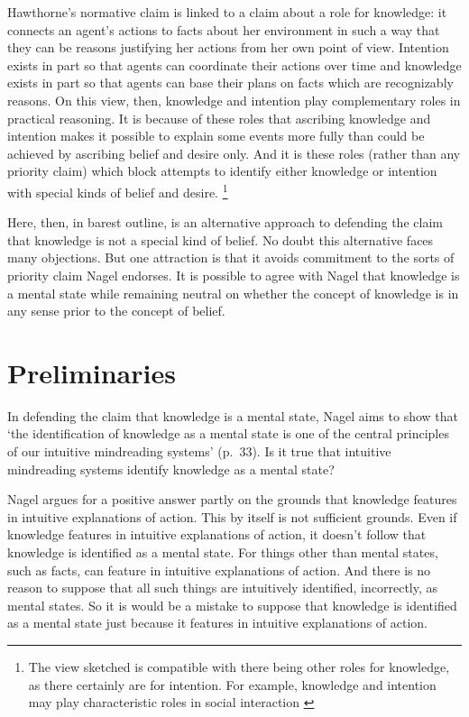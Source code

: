 \documentclass[11pt,a4paper]{extarticle}
\begin{document}
Hawthorne's normative claim is linked to a claim about a role for knowledge: 
it connects an agent's actions to facts about her environment in such a way that they can be reasons justifying her actions from her own point of view.
Intention exists in part so that agents can coordinate their actions over time 
and 
knowledge exists in part so that agents can base their plans on facts which are recognizably reasons.
On this view, then, knowledge and intention play complementary roles in practical reasoning.
It is because of these roles that ascribing knowledge and intention makes it possible to explain some events more fully than could be achieved by ascribing belief and desire only.
And it is these roles 
(rather than any priority claim)
which block attempts to identify either knowledge or intention with special kinds of belief and desire.%
\footnote{
The view sketched is compatible with there being other roles for knowledge, as there certainly are for intention.
For example, knowledge and intention may play characteristic roles in social interaction 
\citep{Craig:1990wt,Bratman:2009lv}
}

Here, then, in barest outline, is an alternative approach to defending the claim that knowledge is not a special kind of belief.
No doubt this alternative faces many objections.
But one attraction is that it avoids commitment to the sorts of priority claim Nagel endorses.
It is possible to agree with Nagel that knowledge is a mental state while remaining neutral on whether the concept of knowledge is in any sense prior to the concept of belief.





\section{Preliminaries}
In defending the claim that knowledge is a mental state, Nagel aims to show that `the identification of knowledge as a mental state is one of the central principles of our intuitive mindreading systems' (p.\ 33).
Is it true that intuitive mindreading systems identify knowledge as a mental state?





Nagel argues for a positive answer
partly on the grounds that 
knowledge features in intuitive explanations of action.
This by itself is not sufficient grounds.
Even if knowledge features in intuitive explanations of action, 
it doesn't follow that
knowledge is identified as a mental state.
For things other than mental states, such as facts, can feature in intuitive explanations of action.
And there is no reason to suppose that all such things are intuitively identified, incorrectly, as mental states.
So it is would be a mistake to suppose that knowledge is identified as a mental state just because it features in intuitive explanations of action.
\end{document}
